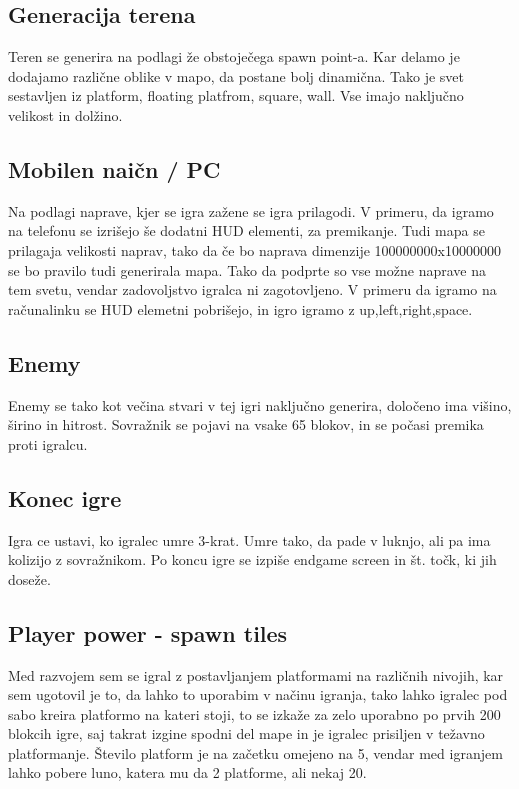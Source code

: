 \documentclass[a4paper,11pt]{article}
\begin{document}
\subsection{Generacija terena}

Teren se generira na podlagi že obstoječega spawn point-a. Kar delamo je dodajamo različne oblike v mapo, da postane bolj dinamična. Tako je svet sestavljen iz platform, floating platfrom, square, wall. Vse imajo naključno velikost in dolžino.

\subsection{Mobilen naičn / PC}

Na podlagi naprave, kjer se igra zažene se igra prilagodi. V primeru, da igramo na telefonu se izrišejo še dodatni HUD elementi, za premikanje. Tudi mapa se prilagaja velikosti naprav, tako da če bo naprava dimenzije 100000000x10000000 se bo pravilo tudi generirala mapa. Tako da podprte so vse možne naprave na tem svetu, vendar zadovoljstvo igralca ni zagotovljeno. V primeru da igramo na računalinku se HUD elemetni pobrišejo, in igro igramo z up,left,right,space.

\subsection{Enemy}

Enemy se tako kot večina stvari v tej igri naključno generira, določeno ima višino, širino in hitrost. Sovražnik se pojavi na vsake 65 blokov, in se počasi premika proti igralcu.

\subsection{Konec igre}

Igra ce ustavi, ko igralec umre 3-krat. Umre tako, da pade v luknjo, ali pa ima kolizijo z sovražnikom. Po koncu igre se izpiše endgame screen in št. točk, ki jih doseže.

\subsection{Player power - spawn tiles}

Med razvojem sem se igral z postavljanjem platformami na različnih nivojih, kar sem ugotovil je to, da lahko to uporabim v načinu igranja, tako lahko igralec pod sabo kreira platformo na kateri stoji, to se izkaže za zelo uporabno po prvih 200 blokcih igre, saj takrat izgine spodni del mape in je igralec prisiljen v težavno platformanje. Število platform je na začetku omejeno na 5, vendar med igranjem lahko pobere luno, katera mu da 2 platforme, ali nekaj 20.
\end{document}
